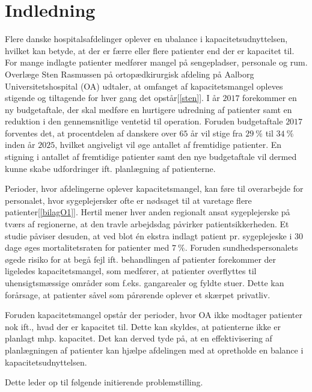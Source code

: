 \chapter{Indledning} \label{indl}
Flere danske hospitalsafdelinger oplever en ubalance i kapacitetsudnyttelsen, hvilket kan betyde, at der er færre eller flere patienter end der er kapacitet til. For mange indlagte patienter medfører mangel på sengepladser, personale og rum.\cite{Company2013} Overlæge Sten Rasmussen på ortopædkirurgisk afdeling på Aalborg Universitetshospital (OA) udtaler, at omfanget af kapacitetsmangel opleves stigende og tiltagende for hver gang det opstår[\ref{sten}]. I år $2017$ forekommer en ny budgetaftale, der skal medføre en hurtigere udredning af patienter samt en reduktion i den gennemsnitlige ventetid til operation\cite{Budget2016}. 
Foruden budgetaftale $2017$ forventes det, at procentdelen af danskere over $65$ år vil stige fra $29~\%$ til $34~\%$ inden år $2025$, hvilket angiveligt vil øge antallet af fremtidige patienter\cite{Handleplan2016}. En stigning i antallet af fremtidige patienter samt den nye budgetaftale vil dermed kunne skabe udfordringer ift. planlægning af patienterne.

Perioder, hvor afdelingerne oplever kapacitetsmangel, kan føre til overarbejde for personalet, hvor sygeplejersker ofte er nødsaget til at varetage flere patienter\cite{Danske2015}[\ref{bilagO1}]. Hertil mener hver anden regionalt ansat sygeplejerske på tværs af regionerne, at den travle arbejdsdag påvirker patientsikkerheden\cite{Kjeldsen2015}. Et studie påviser desuden, at ved blot én ekstra indlagt patient pr. sygeplejeske i $30$ dage øges mortalitetsraten for patienter med $7~\%$\cite{Aiken2002}. Foruden sundhedspersonalets øgede risiko for at begå fejl ift. behandlingen af patienter forekommer der ligeledes kapacitetsmangel, som medfører, at patienter overflyttes til uhensigtsmæssige områder som f.eks. gangarealer og fyldte stuer\cite{Madsen2014}. Dette kan forårsage, at patienter såvel som pårørende oplever et skærpet privatliv\cite{Heidmann2014}.

Foruden kapacitetsmangel opstår der perioder, hvor OA ikke modtager patienter nok ift., hvad der er kapacitet til\cite{REOS}. Dette kan skyldes, at patienterne ikke er planlagt mhp. kapacitet. Det kan derved tyde på, at en effektivisering af planlægningen af patienter kan hjælpe afdelingen med at opretholde en balance i kapacitetsudnyttelsen. 

\noindent
Dette leder op til følgende initierende problemstilling.


